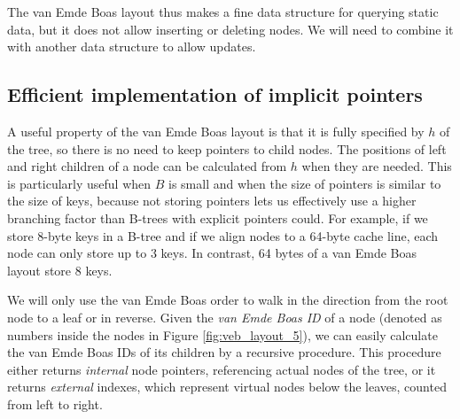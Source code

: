 The van Emde Boas layout thus makes a fine data structure for querying static
data, but it does not allow inserting or deleting nodes. We will need
to combine it with another data structure to allow updates.

\subsection{Efficient implementation of implicit pointers}
A useful property of the van Emde Boas layout is that it is fully specified
by $h$ of the tree, so there is no need to keep pointers to child nodes.
The positions of left and right children of a node can be calculated from
$h$ when they are needed.
This is particularly useful when $B$ is small and when the size of pointers
is similar to the size of keys, because not storing pointers lets us
effectively use a higher branching factor than B-trees with explicit
pointers could.
For example, if we store 8-byte keys in a B-tree and if we align nodes to
a 64-byte cache line, each node can only store up to 3 keys. In contrast,
64 bytes of a van Emde Boas layout store 8 keys.

We will only use the van Emde Boas order to walk in the direction from
the root node to a leaf or in reverse.
Given the \textit{van Emde Boas ID} of a node (denoted as numbers
inside the nodes in Figure \ref{fig:veb_layout_5}),
we can easily calculate the van Emde Boas IDs of its children by
a recursive procedure. This procedure either returns \textit{internal} node
pointers, referencing actual nodes of the tree, or it returns \textit{external}
indexes, which represent virtual nodes below the leaves, counted from left
to right.

